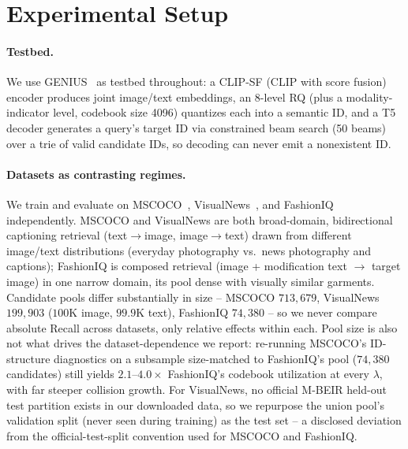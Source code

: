 \section{Experimental Setup}
\label{sec:setup}

\paragraph{Testbed.} We use GENIUS~\cite{kim2025genius} as testbed throughout: a CLIP-SF (CLIP with score fusion) encoder produces joint image/text embeddings, an 8-level RQ (plus a modality-indicator level, codebook size 4096) quantizes each into a semantic ID, and a T5 decoder generates a query's target ID via constrained beam search (50 beams) over a trie of valid candidate IDs, so decoding can never emit a nonexistent ID.

\paragraph{Datasets as contrasting regimes.} We train and evaluate on MSCOCO~\cite{lin2014mscoco}, VisualNews~\cite{liu2021visualnews}, and FashionIQ~\cite{wu2021fashioniq} independently. MSCOCO and VisualNews are both broad-domain, bidirectional captioning retrieval (text$\to$image, image$\to$text) drawn from different image/text distributions (everyday photography vs.\ news photography and captions); FashionIQ is composed retrieval (image + modification text $\to$ target image) in one narrow domain, its pool dense with visually similar garments. Candidate pools differ substantially in size -- MSCOCO $713{,}679$, VisualNews $199{,}903$ ($100$K image, $99.9$K text), FashionIQ $74{,}380$ -- so we never compare absolute Recall across datasets, only relative effects within each. Pool size is also not what drives the dataset-dependence we report: re-running MSCOCO's ID-structure diagnostics on a subsample size-matched to FashionIQ's pool ($74{,}380$ candidates) still yields $2.1$--$4.0\times$ FashionIQ's codebook utilization at every $\lambda$, with far steeper collision growth. For VisualNews, no official M-BEIR held-out test partition exists in our downloaded data, so we repurpose the union pool's validation split (never seen during training) as the test set -- a disclosed deviation from the official-test-split convention used for MSCOCO and FashionIQ.

